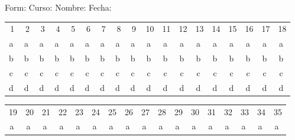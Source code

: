 \documentclass[letterpaper,10pt]{article}
\begin{document}
\begin{center}
Form: \underline{\hspace*{14pt}} Curso: \underline{\hspace*{42pt}} Nombre: \underline{\hspace*{6cm}} Fecha: \underline{\hspace*{2cm}}\\
\begin{tabular}{cccccccccccccccccc}
1 & 2 & 3 & 4 & 5 & 6 & 7 & 8 & 9 & 10 & 11 & 12 & 13 & 14 & 15 & 16 & 17 & 18 \\ 
\textcircled{a} & \textcircled{a} & \textcircled{a} & \textcircled{a} & \textcircled{a} & \textcircled{a} & \textcircled{a} & \textcircled{a} & \textcircled{a} & \textcircled{a} & \textcircled{a} & \textcircled{a} & \textcircled{a} & \textcircled{a} & \textcircled{a} & \textcircled{a} & \textcircled{a} & \textcircled{a} \\ 
\textcircled{b} & \textcircled{b} & \textcircled{b} & \textcircled{b} & \textcircled{b} & \textcircled{b} & \textcircled{b} & \textcircled{b} & \textcircled{b} & \textcircled{b} & \textcircled{b} & \textcircled{b} & \textcircled{b} & \textcircled{b} & \textcircled{b} & \textcircled{b} & \textcircled{b} & \textcircled{b}\\ 
\textcircled{c} & \textcircled{c} & \textcircled{c} & \textcircled{c} & \textcircled{c} & \textcircled{c} & \textcircled{c} & \textcircled{c} & \textcircled{c} & \textcircled{c} & \textcircled{c} & \textcircled{c} & \textcircled{c} & \textcircled{c} & \textcircled{c} & \textcircled{c} & \textcircled{c} & \textcircled{c} \\ 
\textcircled{d} & \textcircled{d} & \textcircled{d} & \textcircled{d} & \textcircled{d} & \textcircled{d} & \textcircled{d} & \textcircled{d} & \textcircled{d} & \textcircled{d} & \textcircled{d} & \textcircled{d} & \textcircled{d} & \textcircled{d} & \textcircled{d} & \textcircled{d} & \textcircled{d} & \textcircled{d} \\ 
\end{tabular}
\vspace*{20pt}
\begin{tabular}{ccccccccccccccccc}
19 & 20 & 21 & 22 & 23 & 24 & 25 & 26 & 27 & 28 & 29 & 30 & 31 & 32 & 33 & 34 & 35\\
\textcircled{a} & \textcircled{a} & \textcircled{a} & \textcircled{a} & \textcircled{a} & \textcircled{a} & \textcircled{a} & \textcircled{a} & \textcircled{a} & \textcircled{a} & \textcircled{a} & \textcircled{a} & \textcircled{a} & \textcircled{a} & \textcircled{a} & \textcircled{a} & \textcircled{a}\\

\end{tabular}
\end{center}
\end{document}
